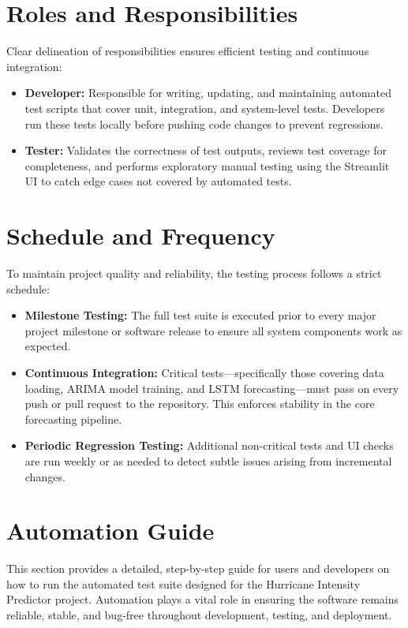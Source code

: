 \section{Roles and Responsibilities}
Clear delineation of responsibilities ensures efficient testing and continuous integration:

\begin{itemize}
	\item \textbf{Developer:}  
	Responsible for writing, updating, and maintaining automated test scripts that cover unit, integration, and system-level tests. Developers run these tests locally before pushing code changes to prevent regressions.
	
	\item \textbf{Tester:}  
	Validates the correctness of test outputs, reviews test coverage for completeness, and performs exploratory manual testing using the Streamlit UI to catch edge cases not covered by automated tests.
\end{itemize}

\section{Schedule and Frequency}
To maintain project quality and reliability, the testing process follows a strict schedule:

\begin{itemize}
	\item \textbf{Milestone Testing:}  
	The full test suite is executed prior to every major project milestone or software release to ensure all system components work as expected.
	
	\item \textbf{Continuous Integration:}  
	Critical tests—specifically those covering data loading, ARIMA model training, and LSTM forecasting—must pass on every push or pull request to the repository. This enforces stability in the core forecasting pipeline.
	
	\item \textbf{Periodic Regression Testing:}  
	Additional non-critical tests and UI checks are run weekly or as needed to detect subtle issues arising from incremental changes.
\end{itemize}

\section{Automation Guide}

This section provides a detailed, step-by-step guide for users and developers on how to run the automated test suite designed for the Hurricane Intensity Predictor project. Automation plays a vital role in ensuring the software remains reliable, stable, and bug-free throughout development, testing, and deployment.

